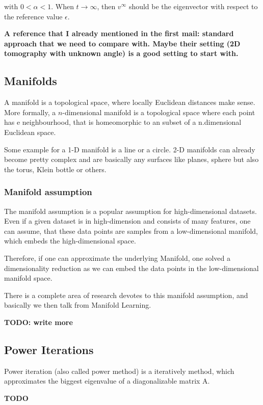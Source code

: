 with $0 < \alpha < 1$. When $t \rightarrow \infty$, then $v^{\infty}$ should be the 
eigenvector with respect to the reference value $\epsilon$.


\textbf{A reference that I already mentioned in the first mail:
standard approach that we need to compare with. 
Maybe their setting (2D tomography with unknown angle) is a good setting to start with.
}

\subsection{Manifolds}
A manifold is a topological space, where locally Euclidean distances make sense.
More formally, a $n$-dimensional manifold is a topological space where
each point has e neighbourhood, that is homeomorphic to an subset of a n.dimensional
Euclidean space.

Some example for a 1-D manifold is a line or a circle. 2-D manifolds can already become 
pretty complex and are basically any surfaces like planes, sphere but also the torus,
Klein bottle or others.

\subsubsection{Manifold assumption}
The manifold assumption is a popular assumption for high-dimensional datasets.
Even if a given dataset is in high-dimension and consists of many features, one can assume,
that these data points are samples from a low-dimensional manifold, 
which embeds the high-dimensional space.

Therefore, if one can approximate the underlying Manifold, one solved a dimensionality reduction
as we can embed the data points in the low-dimensional manifold space.

There is a complete area of research devotes to this manifold assumption, and basically
we then talk from Manifold Learning. 

\textbf{TODO: write more} \cite{ManifoldLearning}


\subsection{Power Iterations}

Power iteration (also called power method) is a iteratively method, 
which approximates the biggest eigenvalue of a diagonalizable matrix A.

\textbf{TODO}

